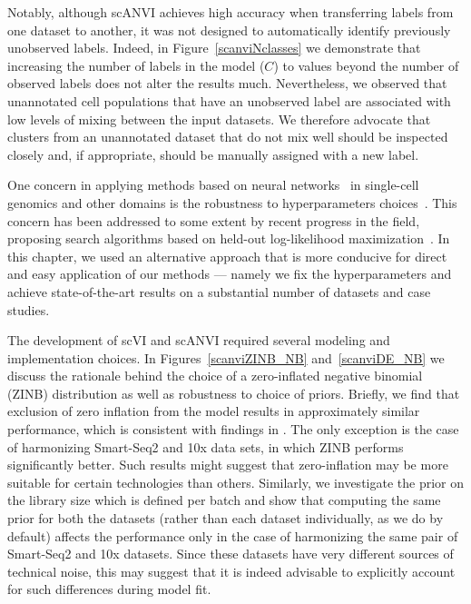 Notably, although scANVI achieves high accuracy when transferring labels from one dataset to another, it was not designed to automatically identify previously unobserved labels. Indeed, in Figure~\ref{scanviNclasses} we demonstrate that increasing the number of labels in the model ($C$) to values beyond the number of observed labels does not alter the results much. Nevertheless, we observed that unannotated cell populations that have an unobserved label are associated with low levels of mixing between the input datasets. We therefore advocate that clusters from an unannotated dataset that do not mix well should be inspected closely and, if appropriate, should be manually assigned with a new label.

One concern in applying methods based on neural networks~\cite{saucie, scvis,VASC,dca,scVAE} in single-cell genomics and other domains is the robustness to hyperparameters choices~\cite{tybalt_param}. This concern has been addressed to some extent by recent progress in the field, proposing search algorithms based on held-out log-likelihood maximization~\cite{dca}. In this chapter, we used an alternative approach that is more conducive for direct and easy application of our methods --- namely we fix the hyperparameters and achieve state-of-the-art results on a substantial number of datasets and case studies. 

The development of scVI and scANVI required several modeling and implementation choices. In Figures~\ref{scanviZINB_NB} and~\ref{scanviDE_NB} we discuss the rationale behind the choice of a zero-inflated negative binomial (ZINB) distribution as well as robustness to choice of priors. Briefly, we find that exclusion of zero inflation from the model results in approximately similar performance, which is consistent with findings in \cite{hafemeister2019normalization, townes2019feature}. The only exception is the case of harmonizing Smart-Seq2 and 10x data sets, in which ZINB performs significantly better. Such results might suggest that zero-inflation may be more suitable for certain technologies than others. Similarly, we investigate the prior on the library size which is defined per batch and show that computing the same prior for both the datasets (rather than each dataset individually, as we do by default) affects the performance only in the case of harmonizing the same pair of Smart-Seq2 and 10x datasets. Since these datasets have very different sources of technical noise, this may suggest that it is indeed advisable to explicitly account for such differences during model fit.

